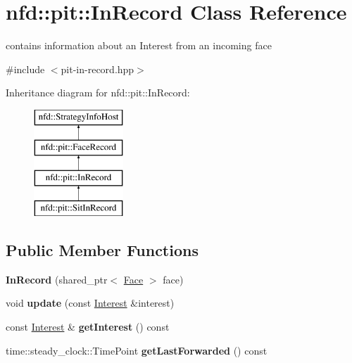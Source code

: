 \hypertarget{classnfd_1_1pit_1_1InRecord}{}\section{nfd\+:\+:pit\+:\+:In\+Record Class Reference}
\label{classnfd_1_1pit_1_1InRecord}


contains information about an Interest from an incoming face  




{\ttfamily \#include $<$pit-\/in-\/record.\+hpp$>$}

Inheritance diagram for nfd\+:\+:pit\+:\+:In\+Record\+:\begin{figure}[H]
\begin{center}
\leavevmode
\includegraphics[height=4.000000cm]{classnfd_1_1pit_1_1InRecord}
\end{center}
\end{figure}
\subsection*{Public Member Functions}
\begin{DoxyCompactItemize}
\item 
{\bfseries In\+Record} (shared\+\_\+ptr$<$ \hyperlink{classnfd_1_1Face}{Face} $>$ face)\hypertarget{classnfd_1_1pit_1_1InRecord_a4007f684859d88b6f61187ca142f680b}{}\label{classnfd_1_1pit_1_1InRecord_a4007f684859d88b6f61187ca142f680b}

\item 
void {\bfseries update} (const \hyperlink{classndn_1_1Interest}{Interest} \&interest)\hypertarget{classnfd_1_1pit_1_1InRecord_a75d2b3faf73860a09434d9f518287a01}{}\label{classnfd_1_1pit_1_1InRecord_a75d2b3faf73860a09434d9f518287a01}

\item 
const \hyperlink{classndn_1_1Interest}{Interest} \& {\bfseries get\+Interest} () const\hypertarget{classnfd_1_1pit_1_1InRecord_a78926693b546060a7dea6683fdba153c}{}\label{classnfd_1_1pit_1_1InRecord_a78926693b546060a7dea6683fdba153c}

\item 
time\+::steady\+\_\+clock\+::\+Time\+Point {\bfseries get\+Last\+Forwarded} () const\hypertarget{classnfd_1_1pit_1_1InRecord_abfea605d095497988241e3c29975d856}{}\label{classnfd_1_1pit_1_1InRecord_abfea605d095497988241e3c29975d856}

\end{DoxyCompactItemize}
